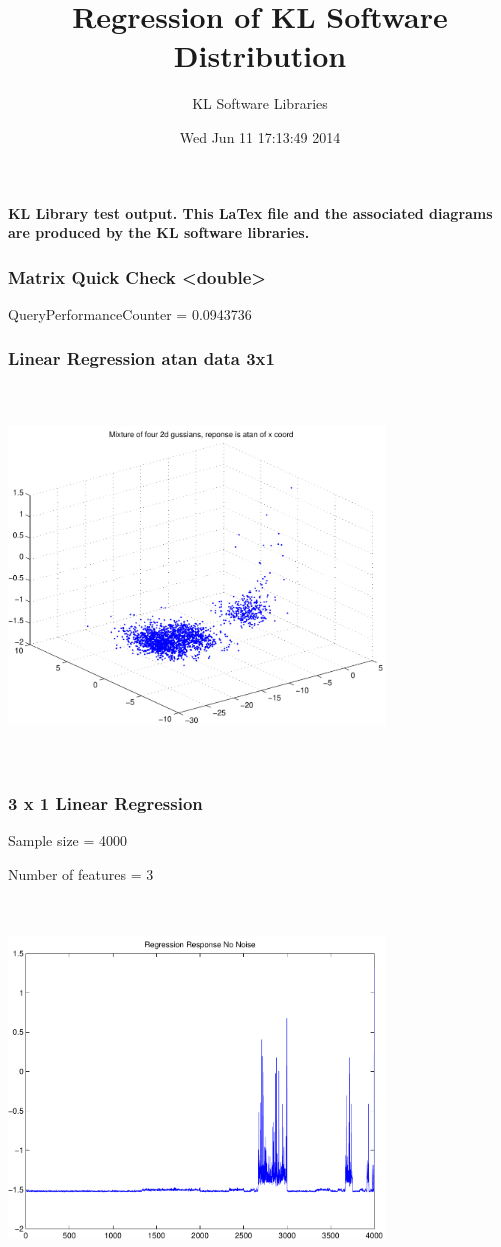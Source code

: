 \documentclass[9pt]{article}
\theoremstyle{plain}
\theoremstyle{definition}
\theoremstyle{remark}
\numberwithin{equation}{section}
\begin{document}
\title{Regression of KL Software Distribution   }
\author{KL Software Libraries}
\date{Wed Jun 11 17:13:49 2014
}
\maketitle
\textbf{ KL Library test output.  This LaTex file and the associated diagrams are produced by the KL software libraries.}
\subsubsection{Matrix Quick Check <double>}
QueryPerformanceCounter  =  0.0943736
\subsubsection{Linear Regression atan data 3x1}
\includegraphics[width=10.0cm,height=10.0cm]{AtanDataSet.pdf}

\subsubsection{3 x 1 Linear Regression}
Sample size = 4000

Number of features = 3

\includegraphics[width=10.0cm,height=10.0cm]{AtanDataSet_regression_response_no_noise.pdf}
\end{document}
